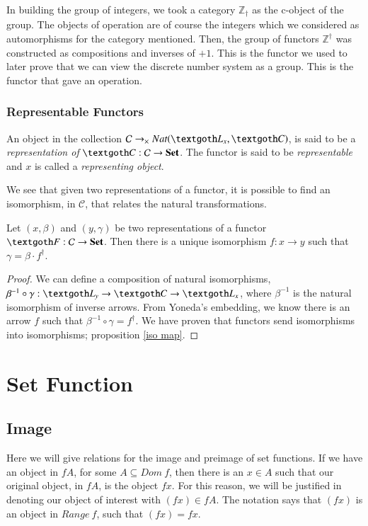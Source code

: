 \documentclass [12pt]{book}
\begin{document}
In building the group of integers, we took a category $\mathbb Z_\dagger$ as the c-object of the group. The objects of operation are of course the integers which we considered as automorphisms for the category mentioned. Then, the group of functors $\mathbb Z^\dagger$ was constructed as compositions and inverses of $+1$. This is the functor we used to later prove that we can view the discrete number system as a group. This is the functor that gave an operation.

			\subsubsection{Representable Functors}An object in the collection $\mathcal C\rightarrow_\times Nat(\textgoth L_x,\textgoth C)$, is said to be a \textit{representation of} $\textgoth C:\mathcal C\rightarrow\textbf{Set}$. The functor is said to be \textit{representable} and $x$ is called a \textit{representing object}.

We see that given two representations of a functor, it is possible to find an isomorphism, in $\mathcal C$, that relates the natural transformations.

\begin{proposition}Let $(x,\beta)$ and $(y,\gamma)$ be two representations of a functor $\textgoth F:\mathcal C\rightarrow\textbf{Set}$. Then there is a unique isomorphism $f:x\rightarrow y$ such that $\gamma=\beta\cdot f^\dagger$.\end{proposition}

\begin{proof}We can define a composition of natural isomorphisms, $\beta^{-1}\circ\gamma:\textgoth L_y\rightarrow\textgoth C\rightarrow \textgoth L_x$, where $\beta^{-1}$ is the natural isomorphism of inverse arrows. From Yoneda's embedding, we know there is an arrow $f$ such that $\beta^{-1}\circ\gamma=f^\dagger$. We have proven that functors send isomorphisms into isomorphisms; proposition \ref{iso map}.\end{proof}

	\section{Set Function}

		\subsection{Image}

Here we will give relations for the image and preimage of set functions. If we have an object in $fA$, for some $A\subseteq Dom~f$, then there is an $x\in A$ such that our original object, in $fA$, is the object $fx$. For this reason, we will be justified in denoting our object of interest with $(fx)\in fA$. The notation says that $(fx)$ is an object in $Range~f$, such that $(fx)=fx$.
\end{document}
